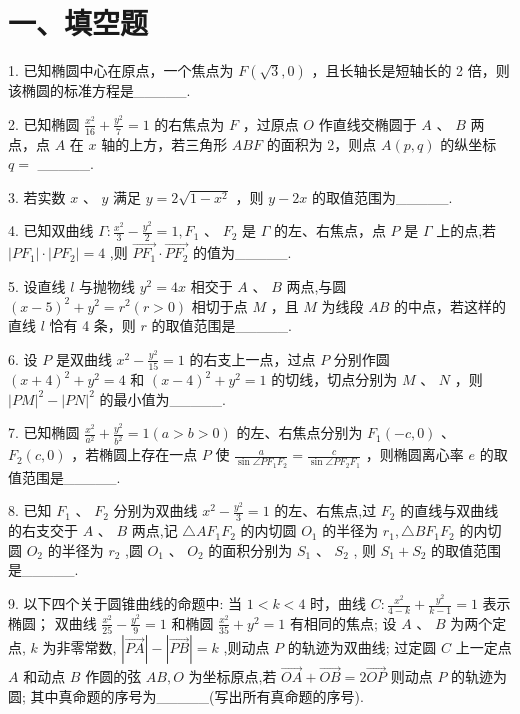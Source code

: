 \section*{一、填空题}

1. 已知椭圆中心在原点，一个焦点为 $F\left( {\sqrt{3},0}\right)$ ，且长轴长是短轴长的 2 倍，则该椭圆的标准方程是\_\_\_\_\_.

2. 已知椭圆 $\frac{{x}^{2}}{16} + \frac{{y}^{2}}{7} = 1$ 的右焦点为 $F$ ，过原点 $O$ 作直线交椭圆于 $A$ 、 $B$ 两点，点 $A$ 在 $x$ 轴的上方，若三角形 ${ABF}$ 的面积为 2，则点 $A\left( {p,q}\right)$ 的纵坐标 $q =$ \_\_\_\_\_.

3. 若实数 $x$ 、 $y$ 满足 $y = 2\sqrt{1 - {x}^{2}}$ ，则 $y - {2x}$ 的取值范围为\_\_\_\_\_.

4. 已知双曲线 $\Gamma  : \frac{{x}^{2}}{3} - \frac{{y}^{2}}{2} = 1,{F}_{1}\text{ 、 }{F}_{2}$ 是 $\Gamma$ 的左、右焦点，点 $P$ 是 $\Gamma$ 上的点,若 $\left| {P{F}_{1}}\right|  \cdot  \left| {P{F}_{2}}\right|  = 4$ ,则 $\overrightarrow{P{F}_{1}} \cdot  \overrightarrow{P{F}_{2}}$ 的值为\_\_\_\_\_.

5. 设直线 $l$ 与抛物线 ${y}^{2} = {4x}$ 相交于 $A$ 、 $B$ 两点,与圆 ${\left( x - 5\right) }^{2} + {y}^{2} = {r}^{2}\left( {r > 0}\right)$ 相切于点 $M$ ，且 $M$ 为线段 ${AB}$ 的中点，若这样的直线 $l$ 恰有 4 条，则 $r$ 的取值范围是\_\_\_\_\_.

6. 设 $P$ 是双曲线 ${x}^{2} - \frac{{y}^{2}}{15} = 1$ 的右支上一点，过点 $P$ 分别作圆 ${\left( x + 4\right) }^{2} + {y}^{2} = 4$ 和 ${\left( x - 4\right) }^{2} + {y}^{2} = 1$ 的切线，切点分别为 $M$ 、 $N$ ，则 ${\left| PM\right| }^{2} - {\left| PN\right| }^{2}$ 的最小值为\_\_\_\_\_.

7. 已知椭圆 $\frac{{x}^{2}}{{a}^{2}} + \frac{{y}^{2}}{{b}^{2}} = 1\left( {a > b > 0}\right)$ 的左、右焦点分别为 ${F}_{1}\left( {-c,0}\right)$ 、 ${F}_{2}\left( {c,0}\right)$ ，若椭圆上存在一点 $P$ 使 $\frac{a}{\sin \angle P{F}_{1}{F}_{2}} = \frac{c}{\sin \angle P{F}_{2}{F}_{1}}$ ，则椭圆离心率 $e$ 的取值范围是\_\_\_\_\_.

8. 已知 ${F}_{1}$ 、 ${F}_{2}$ 分别为双曲线 ${x}^{2} - \frac{{y}^{2}}{3} = 1$ 的左、右焦点,过 ${F}_{2}$ 的直线与双曲线的右支交于 $A$ 、 $B$ 两点,记 $\bigtriangleup A{F}_{1}{F}_{2}$ 的内切圆 ${O}_{1}$ 的半径为 ${r}_{1},\bigtriangleup B{F}_{1}{F}_{2}$ 的内切圆 ${O}_{2}$ 的半径为 ${r}_{2}$ ,圆 ${O}_{1}\text{ 、 }{O}_{2}$ 的面积分别为 ${S}_{1}\text{ 、 }{S}_{2}$ , 则 ${S}_{1} + {S}_{2}$ 的取值范围是\_\_\_\_\_.

9. 以下四个关于圆锥曲线的命题中:   当 $1 < k < 4$ 时，曲线 $C : \frac{{x}^{2}}{4 - k} + \frac{{y}^{2}}{k - 1} = 1$ 表示椭圆；   双曲线 $\frac{{x}^{2}}{25} -  \frac{{y}^{2}}{9} = 1$ 和椭圆 $\frac{{x}^{2}}{35} + {y}^{2} = 1$ 有相同的焦点;   设 $A\text{ 、 }B$ 为两个定点, $k$ 为非零常数, $\left| \overrightarrow{PA}\right|  - \left| \overrightarrow{PB}\right|  = k$ ,则动点 $P$ 的轨迹为双曲线;   过定圆 $C$ 上一定点 $A$ 和动点 $B$ 作圆的弦 ${AB},O$ 为坐标原点,若 $\overrightarrow{OA} + \overrightarrow{OB} = 2\overrightarrow{OP}$ 则动点 $P$ 的轨迹为圆; 其中真命题的序号为\_\_\_\_\_(写出所有真命题的序号).

